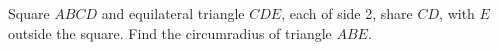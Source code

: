 Square $ABCD$ and equilateral triangle $CDE$, each of side 2, share $CD$, with $E$ outside the square. Find the circumradius of triangle $ABE$.

